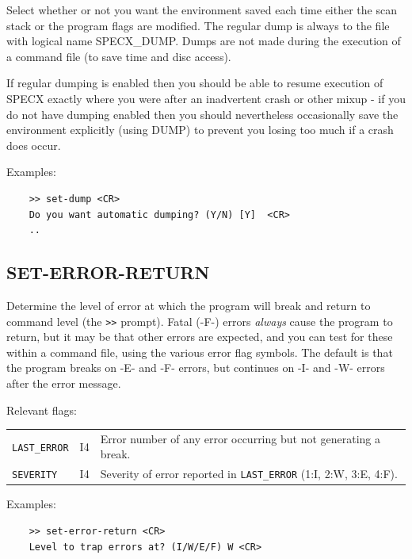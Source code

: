 \documentclass[11pt,twoside]{report}
\begin{document}
Select whether or not you want the environment saved each time either the
 scan stack or the program flags are
modified. The regular dump is always to the file with logical name SPECX\_DUMP.
 
Dumps are not made during the execution of a command file
(to save time and disc access). 

If regular dumping is enabled then you should be able to resume execution of
SPECX exactly where you were after an inadvertent crash or other mixup - if you
do not have dumping enabled then you should nevertheless occasionally save the
environment explicitly (using DUMP)  to prevent you losing too much
if a crash does occur. 

Examples:
\begin{verbatim}
    >> set-dump <CR>
    Do you want automatic dumping? (Y/N) [Y]  <CR>
    ..
\end{verbatim}

\subsection{SET-ERROR-RETURN} 

Determine the level of error at which the  program will break and return
to command level (\ie the \verb+>>+ prompt). Fatal (-F-) errors {\em always}
cause the program to return, but it may be that other errors are expected,
and you can test for these within a command file, using the various error
flag symbols. The default is that the program breaks on -E- and -F- errors,
but continues on -I- and -W- errors after the error message.

Relevant flags:\\
\begin{tabular}{lll}
   \verb+LAST_ERROR+ & I4 & Error number of any error occurring but not generating
                            a break.\\
   \verb+SEVERITY+   & I4 & Severity of error reported in \verb+LAST_ERROR+
                            (1:I, 2:W, 3:E, 4:F).
\end{tabular}

Examples:
\begin{verbatim}
    >> set-error-return <CR>
    Level to trap errors at? (I/W/E/F) W <CR>
\end{verbatim}
\end{document}
